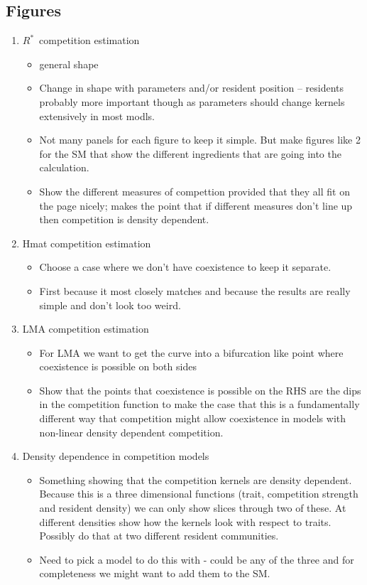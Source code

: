 \documentclass[a4paper,11pt]{article}
\newcommand{\Rstar}{\ensuremath{R^*}}
\begin{document}
\subsection{Figures}


\begin{enumerate}
\item \Rstar\ competition estimation
  \begin{itemize}
  \item general shape
  \item Change in shape with parameters and/or resident position --
    residents probably more important though as parameters should
    change kernels extensively in most modls.
  \item Not many panels for each figure to keep it simple.  But make
    figures like 2 for the SM that show the different ingredients that
    are going into the calculation.
  \item Show the different measures of compettion provided that they
    all fit on the page nicely; \citet{Abrams-2008} makes the point
    that if different measures don't line up then competition is
    density dependent.
  \end{itemize}
\item Hmat competition estimation
  \begin{itemize}
  \item Choose a case where we don't have coexistence to keep it
    separate.
  \item First because it most closely matches \citet{Kisdi-1999} and
    because the results are really simple and don't look too weird.
  \end{itemize}
\item LMA competition estimation
  \begin{itemize}
  \item For LMA we want to get the curve into a bifurcation like point
    where coexistence is possible on both sides
  \item Show that the points that coexistence is possible on the RHS
    are the dips in the competition function to make the case that
    this is a fundamentally different way that competition might allow
    coexistence in models with non-linear density dependent
    competition.
  \end{itemize}
\item Density dependence in competition models
  \begin{itemize}
  \item Something showing that the competition kernels are density
    dependent.  Because this is a three dimensional functions (trait,
    competition strength and resident density) we can only show slices
    through two of these.  At different densities show how the
    kernels look with respect to traits.  Possibly do that at two
    different resident communities.
  \item Need to pick a model to do this with - could be any of the
    three and for completeness we might want to add them to the SM.
  \end{itemize}
\end{enumerate}
\end{document}
